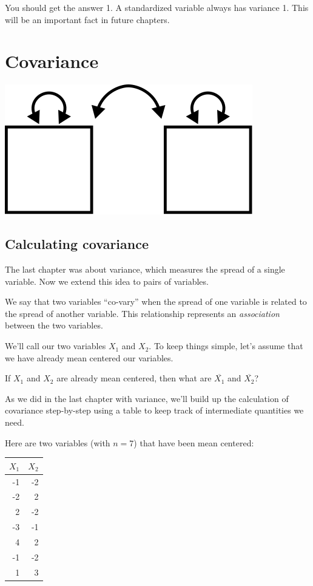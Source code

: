 \documentclass[
]{book}
\begin{document}
You should get the answer 1. A standardized variable always has variance 1. This will be an important fact in future chapters.

\hypertarget{covariance}{%
\chapter{Covariance}\label{covariance}}

\begin{center}\includegraphics{graphics/covariance} \end{center}

\hypertarget{covariance-calculating}{%
\section{Calculating covariance}\label{covariance-calculating}}

The last chapter was about variance, which measures the spread of a single variable. Now we extend this idea to pairs of variables.

We say that two variables ``co-vary'' when the spread of one variable is related to the spread of another variable. This relationship represents an \emph{association} between the two variables.

We'll call our two variables \(X_{1}\) and \(X_{2}\). To keep things simple, let's assume that we have already mean centered our variables.

If \(X_{1}\) and \(X_{2}\) are already mean centered, then what are \(\overline{X_{1}}\) and \(\overline{X_{2}}\)?

As we did in the last chapter with variance, we'll build up the calculation of covariance step-by-step using a table to keep track of intermediate quantities we need.

Here are two variables (with \(n = 7\)) that have been mean centered:

\begin{longtable}[]{@{}rr@{}}
\toprule
\(X_{1}\) & \(X_{2}\) \\
\midrule
\endhead
-1 & -2 \\
-2 & 2 \\
2 & -2 \\
-3 & -1 \\
4 & 2 \\
-1 & -2 \\
1 & 3 \\
\bottomrule
\end{longtable}
\end{document}
